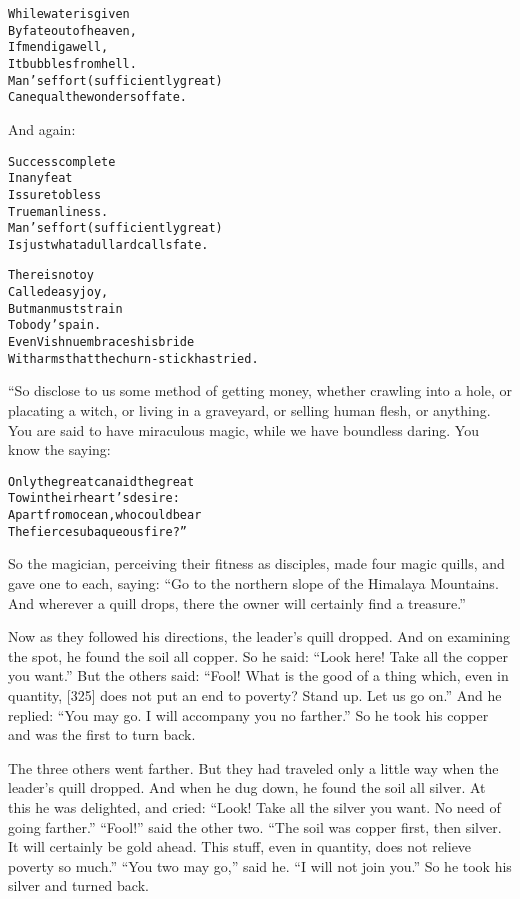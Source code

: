 \documentclass{article}
\renewenvironment{verbatim}{\begin{alltt}\normalfont\begin{centering}}{\end{centering}\end{alltt}}
\begin{document}
\begin{verbatim}
While water is given
By fate out of heaven,
If men dig a well,
It bubbles from hell.
Man's effort (sufficiently great)
Can equal the wonders of fate.
\end{verbatim}
And again:

\begin{verbatim}
Success complete
In any feat
Is sure to bless
True manliness.
Man's effort (sufficiently great)
Is just what a dullard calls fate.

There is no toy
Called easy joy,
But man must strain
To body's pain.
Even Vishnu embraces his bride
With arms that the churn-stick has tried.
\end{verbatim}
“So disclose to us some method of getting money, whether crawling
into a hole, or placating a witch, or living in a graveyard, or
selling human flesh, or anything. You are said to have miraculous
magic, while we have boundless daring. You know the saying:

\begin{verbatim}
Only the great can aid the great
    To win their heart's desire:
Apart from ocean, who could bear
    The fierce subaqueous fire?”
\end{verbatim}
So the magician, perceiving their fitness as disciples, made four
magic quills, and gave one to each, saying:
``Go to the northern slope of the Himalaya Mountains. And wherever a quill drops, there the owner will certainly find a treasure.''

Now as they followed his directions, the leader's quill dropped.
And on examining the spot, he found the soil all copper. So he
said: ``Look here! Take all the copper you want.'' But the others
said:
``Fool! What is the good of a thing which, even in quantity, [325] does not put an end to poverty? Stand up. Let us go on.''
And he replied: ``You may go. I will accompany you no farther.'' So
he took his copper and was the first to turn back.

The three others went farther. But they had traveled only a little
way when the leader's quill dropped. And when he dug down, he found
the soil all silver. At this he was delighted, and cried:
``Look! Take all the silver you want. No need of going farther.''
``Fool!'' said the other two.
``The soil was copper first, then silver. It will certainly be gold ahead. This stuff, even in quantity, does not relieve poverty so much.''
``You two may go,'' said he. ``I will not join you.'' So he took
his silver and turned back.
\end{document}
